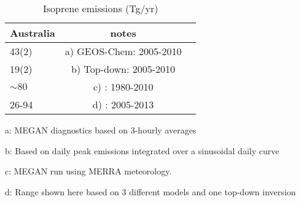     
    
    
    \begin{table}\begin{threeparttable}
      \caption{Isoprene emissions (Tg/yr)}
      \begin{tabular}{ l  c  >{\arraybackslash}p{10cm} } 
        \toprule
        Australia & notes \\
        \midrule
        43(2) & a) GEOS-Chem: 2005-2010 \\ %
        19(2) & b) Top-down: 2005-2010 \\
        $\sim 80$ & c) \textcite{Sindelarova2014}: 1980-2010 \\ %
        26-94 & d) \textcite{Bauwens2016}: 2005-2013\\
        
        \bottomrule
      \end{tabular}
      \begin{tablenotes} 
        \item a: MEGAN diagnostics based on 3-hourly averages
        \item b: Based on daily peak emissions integrated over a sinusoidal daily curve
        \item c: MEGAN run using MERRA meteorology.  
        \item d: Range shown here based on 3 different models and one top-down inversion
      \end{tablenotes}
      \label{BioIsop:results:emissions:tab_emissions_Tg}
    \end{threeparttable}\end{table}
  
